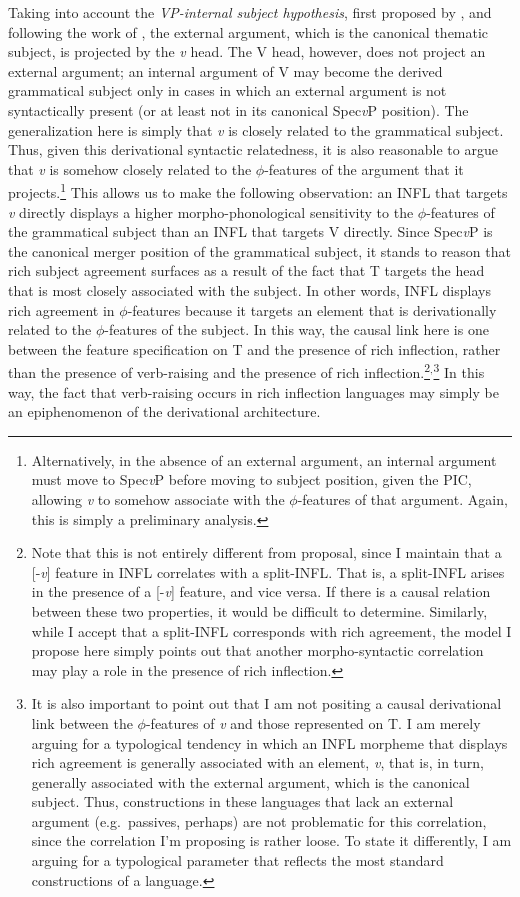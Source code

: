 Taking into account the {\it VP-internal subject hypothesis}, first proposed by \citet{kuroda1988}, and following the work of \citet{kratzer1996}, the external argument, which is the canonical thematic subject, is projected by the {\it v} head. The V head, however, does not project an external argument; an internal argument of V may become the derived grammatical subject only in cases in which an external argument is not syntactically present (or at least not in its canonical Spec{\it v}P position). The generalization here is simply that {\it v} is closely related to the grammatical subject. Thus, given this derivational syntactic relatedness, it is also reasonable to argue that {\it v} is somehow closely related to the $\phi$-features of the argument that it projects.\footnote{Alternatively, in the absence of an external argument, an internal argument must move to Spec{\it v}P before moving to subject position, given the PIC, allowing {\it v} to somehow associate with the $\phi$-features of that argument. Again, this is simply a preliminary analysis.} This allows us to make the following observation: an INFL that targets {\it v} directly displays a higher morpho-phonological sensitivity to the $\phi$-features of the grammatical subject than an INFL that targets V directly. Since Spec{\it v}P is the canonical merger position of the grammatical subject, it stands to reason that rich subject agreement surfaces as a result of the fact that T targets the head that is most closely associated with the subject. In other words, INFL displays rich agreement in $\phi$-features because it targets an element that is derivationally related to the $\phi$-features of the subject. In this way, the causal link here is one between the feature specification on T and the presence of rich inflection, rather than the presence of verb-raising and the presence of rich inflection.\footnote{Note that this is not entirely different from  proposal, since I maintain that a [-{\it v}] feature in INFL correlates with a split-INFL. That is, a split-INFL arises in the presence of a [-{\it v}] feature, and vice versa. If there is a causal relation between these two properties, it would be difficult to determine. Similarly, while I accept that a split-INFL corresponds with rich agreement, the model I propose here simply points out that another morpho-syntactic correlation may play a role in the presence of rich inflection.}$^{,}$\footnote{It is also important to point out that I am not positing a causal derivational link between the $\phi$-features of {\it v} and those represented on T. I am merely arguing for a typological tendency in which an INFL morpheme that displays rich agreement is generally associated with an element, {\it v}, that is, in turn, generally associated with the external argument, which is the canonical subject. Thus, constructions in these languages that lack an external argument (e.g.\ passives, perhaps) are not problematic for this correlation, since the correlation I'm proposing is rather loose. To state it differently, I am arguing for a typological parameter that reflects the most standard constructions of a language.} In this way, the fact that verb-raising occurs in rich inflection languages may simply be an epiphenomenon of the derivational architecture. 